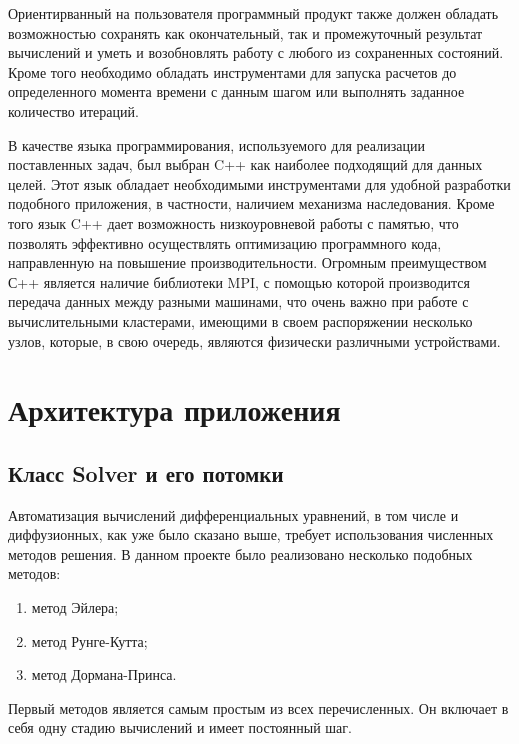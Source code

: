 \documentclass[a4paper, 14pt]{extarticle}
\theoremstyle{definition}
\begin{document}
\par Ориентирванный на пользователя программный продукт также должен обладать возможностью сохранять как окончательный, так и промежуточный результат вычислений и уметь и возобновлять работу с любого из сохраненных состояний. Кроме того необходимо обладать инструментами для запуска расчетов до определенного момента времени с данным шагом или выполнять заданное количество итераций.

\par В качестве языка программирования, используемого для реализации поставленных задач, был выбран C++ как наиболее подходящий для данных целей. Этот язык обладает необходимыми инструментами для удобной разработки подобного приложения, в частности, наличием механизма наследования. Кроме того язык C++ дает возможность низкоуровневой работы с памятью, что позволять эффективно осуществлять оптимизацию программного кода, направленную на повышение производительности.  Огромным преимуществом С++ является наличие библиотеки MPI, с помощью которой производится передача данных между разными машинами, что очень важно при работе с вычислительными кластерами, имеющими в своем распоряжении несколько узлов, которые, в свою очередь, являются физически различными устройствами.


\section{Архитектура приложения}

\subsection{Класс Solver и его потомки}

\par Автоматизация вычислений дифференциальных уравнений, в том числе и диффузионных, как уже было сказано выше, требует использования численных методов решения. В данном проекте было реализовано несколько подобных методов:
\begin{enumerate}
\item метод Эйлера;
\item метод Рунге-Кутта;
\item метод Дормана-Принса.
\end{enumerate}

\par Первый методов является самым простым из всех перечисленных. Он включает в себя одну стадию вычислений и имеет постоянный шаг.
\end{document}
